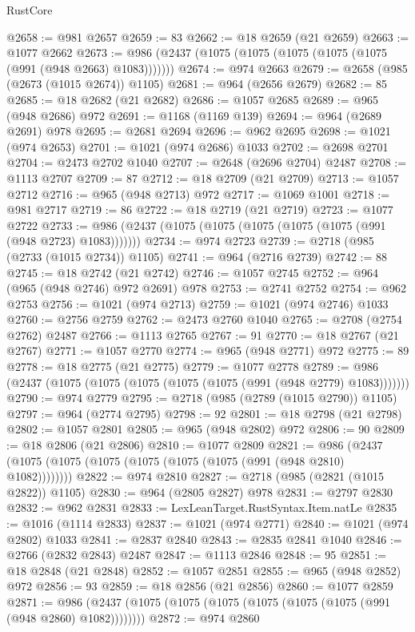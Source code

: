 \begin{lexlean}{RustCore}
\begin{coremodule}
@2658 := @981 @2657
@2659 := 83
@2662 := @18 @2659 (@21 @2659)
@2663 := @1077 @2662
@2673 := @986 (@2437 (@1075 (@1075 (@1075 (@1075 (@1075 (@991 (@948 @2663) @1083)))))))
@2674 := @974 @2663
@2679 := @2658 (@985 (@2673 (@1015 @2674)) @1105)
@2681 := @964 (@2656 @2679)
@2682 := 85
@2685 := @18 @2682 (@21 @2682)
@2686 := @1057 @2685
@2689 := @965 (@948 @2686) @972
@2691 := @1168 (@1169 @139)
@2694 := @964 (@2689 @2691) @978
@2695 := @2681 @2694
@2696 := @962 @2695
@2698 := @1021 (@974 @2653)
@2701 := @1021 (@974 @2686) @1033
@2702 := @2698 @2701
@2704 := @2473 @2702 @1040
@2707 := @2648 (@2696 @2704) @2487
@2708 := @1113 @2707
@2709 := 87
@2712 := @18 @2709 (@21 @2709)
@2713 := @1057 @2712
@2716 := @965 (@948 @2713) @972
@2717 := @1069 @1001
@2718 := @981 @2717
@2719 := 86
@2722 := @18 @2719 (@21 @2719)
@2723 := @1077 @2722
@2733 := @986 (@2437 (@1075 (@1075 (@1075 (@1075 (@1075 (@991 (@948 @2723) @1083)))))))
@2734 := @974 @2723
@2739 := @2718 (@985 (@2733 (@1015 @2734)) @1105)
@2741 := @964 (@2716 @2739)
@2742 := 88
@2745 := @18 @2742 (@21 @2742)
@2746 := @1057 @2745
@2752 := @964 (@965 (@948 @2746) @972 @2691) @978
@2753 := @2741 @2752
@2754 := @962 @2753
@2756 := @1021 (@974 @2713)
@2759 := @1021 (@974 @2746) @1033
@2760 := @2756 @2759
@2762 := @2473 @2760 @1040
@2765 := @2708 (@2754 @2762) @2487
@2766 := @1113 @2765
@2767 := 91
@2770 := @18 @2767 (@21 @2767)
@2771 := @1057 @2770
@2774 := @965 (@948 @2771) @972
@2775 := 89
@2778 := @18 @2775 (@21 @2775)
@2779 := @1077 @2778
@2789 := @986 (@2437 (@1075 (@1075 (@1075 (@1075 (@1075 (@991 (@948 @2779) @1083)))))))
@2790 := @974 @2779
@2795 := @2718 (@985 (@2789 (@1015 @2790)) @1105)
@2797 := @964 (@2774 @2795)
@2798 := 92
@2801 := @18 @2798 (@21 @2798)
@2802 := @1057 @2801
@2805 := @965 (@948 @2802) @972
@2806 := 90
@2809 := @18 @2806 (@21 @2806)
@2810 := @1077 @2809
@2821 := @986 (@2437 (@1075 (@1075 (@1075 (@1075 (@1075 (@1075 (@991 (@948 @2810) @1082))))))))
@2822 := @974 @2810
@2827 := @2718 (@985 (@2821 (@1015 @2822)) @1105)
@2830 := @964 (@2805 @2827) @978
@2831 := @2797 @2830
@2832 := @962 @2831
@2833 := LexLeanTarget.RustSyntax.Item.natLe
@2835 := @1016 (@1114 @2833)
@2837 := @1021 (@974 @2771)
@2840 := @1021 (@974 @2802) @1033
@2841 := @2837 @2840
@2843 := @2835 @2841 @1040
@2846 := @2766 (@2832 @2843) @2487
@2847 := @1113 @2846
@2848 := 95
@2851 := @18 @2848 (@21 @2848)
@2852 := @1057 @2851
@2855 := @965 (@948 @2852) @972
@2856 := 93
@2859 := @18 @2856 (@21 @2856)
@2860 := @1077 @2859
@2871 := @986 (@2437 (@1075 (@1075 (@1075 (@1075 (@1075 (@1075 (@991 (@948 @2860) @1082))))))))
@2872 := @974 @2860

\end{coremodule}
\end{lexlean}
